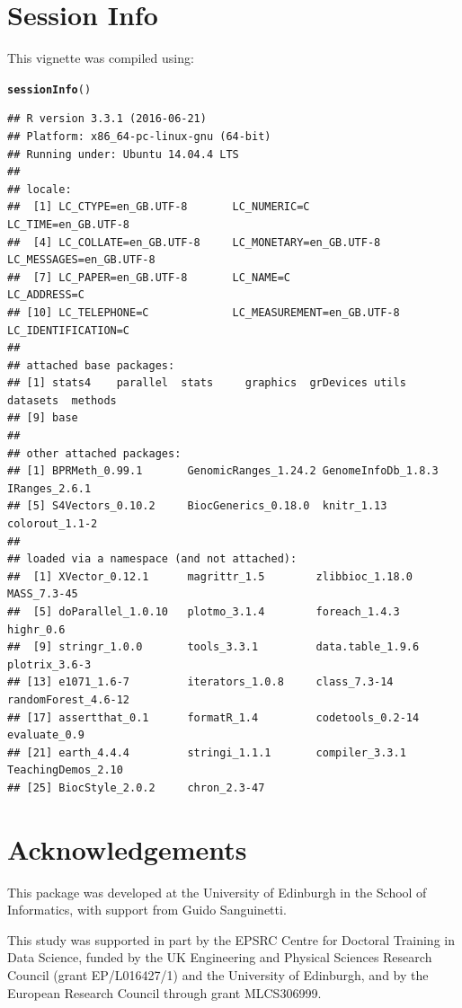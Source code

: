 \documentclass{article}\usepackage[]{graphicx}\usepackage[usenames,dvipsnames]{color}
\makeatletter
\newcommand{\hlstd}[1]{\textcolor[rgb]{0.345,0.345,0.345}{#1}}%
\newcommand{\hlkwd}[1]{\textcolor[rgb]{0.737,0.353,0.396}{\textbf{#1}}}%
\newenvironment{kframe}{%
 \def\at@end@of@kframe{}%
 \ifinner\ifhmode%
  \def\at@end@of@kframe{\end{minipage}}%
  \begin{minipage}{\columnwidth}%
 \fi\fi%
 \def\FrameCommand##1{\hskip\@totalleftmargin \hskip-\fboxsep
 \colorbox{shadecolor}{##1}\hskip-\fboxsep
     \hskip-\linewidth \hskip-\@totalleftmargin \hskip\columnwidth}%
 \MakeFramed {\advance\hsize-\width
   \@totalleftmargin\z@ \linewidth\hsize
   \@setminipage}}%
 {\par\unskip\endMakeFramed%
 \at@end@of@kframe}
\newenvironment{knitrout}{}{} %
\makeatother
\begin{document}
\section{Session Info}
This vignette was compiled using:
\begin{knitrout}
\color{fgcolor}\begin{kframe}
\begin{alltt}
\hlkwd{sessionInfo}\hlstd{()}
\end{alltt}
\begin{verbatim}
## R version 3.3.1 (2016-06-21)
## Platform: x86_64-pc-linux-gnu (64-bit)
## Running under: Ubuntu 14.04.4 LTS
## 
## locale:
##  [1] LC_CTYPE=en_GB.UTF-8       LC_NUMERIC=C               LC_TIME=en_GB.UTF-8       
##  [4] LC_COLLATE=en_GB.UTF-8     LC_MONETARY=en_GB.UTF-8    LC_MESSAGES=en_GB.UTF-8   
##  [7] LC_PAPER=en_GB.UTF-8       LC_NAME=C                  LC_ADDRESS=C              
## [10] LC_TELEPHONE=C             LC_MEASUREMENT=en_GB.UTF-8 LC_IDENTIFICATION=C       
## 
## attached base packages:
## [1] stats4    parallel  stats     graphics  grDevices utils     datasets  methods  
## [9] base     
## 
## other attached packages:
## [1] BPRMeth_0.99.1       GenomicRanges_1.24.2 GenomeInfoDb_1.8.3   IRanges_2.6.1       
## [5] S4Vectors_0.10.2     BiocGenerics_0.18.0  knitr_1.13           colorout_1.1-2      
## 
## loaded via a namespace (and not attached):
##  [1] XVector_0.12.1      magrittr_1.5        zlibbioc_1.18.0     MASS_7.3-45        
##  [5] doParallel_1.0.10   plotmo_3.1.4        foreach_1.4.3       highr_0.6          
##  [9] stringr_1.0.0       tools_3.3.1         data.table_1.9.6    plotrix_3.6-3      
## [13] e1071_1.6-7         iterators_1.0.8     class_7.3-14        randomForest_4.6-12
## [17] assertthat_0.1      formatR_1.4         codetools_0.2-14    evaluate_0.9       
## [21] earth_4.4.4         stringi_1.1.1       compiler_3.3.1      TeachingDemos_2.10 
## [25] BiocStyle_2.0.2     chron_2.3-47
\end{verbatim}
\end{kframe}
\end{knitrout}

\section{Acknowledgements}
This package was developed at the University of Edinburgh in the School of Informatics, with support from Guido
Sanguinetti.

This study was supported in part by the EPSRC Centre for Doctoral Training in Data Science, funded by the UK Engineering and Physical Sciences Research Council (grant EP/L016427/1) and the University of Edinburgh, and by the European Research Council through grant MLCS306999.


\end{document}
